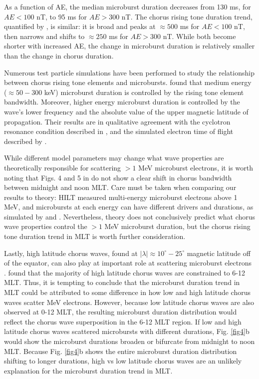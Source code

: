 \documentclass[draft]{agujournal2019}
\begin{document}
As a function of AE, the median microburst duration decreases from 130 ms, for $AE < 100$ nT, to 95 ms for $AE > 300$ nT. The chorus rising tone duration trend, quantified by , is similar: it is broad and peaks at $\approx 500$ ms for $AE < 100$ nT, then narrows and shifts to $\approx 250$ ms for $AE > 300$ nT. While both become shorter with increased AE, the change in microburst duration is relatively smaller than the change in chorus duration.

Numerous test particle simulations have been performed to study the relationship between chorus rising tone elements and microbursts.  found that medium energy ($\approx 50-300$ keV) microburst duration is controlled by the rising tone element bandwidth. Moreover, higher energy microburst duration is controlled by the wave's lower frequency and the absolute value of the upper magnetic latitude of propagation. Their results are in qualitative agreement with the cyclotron resonance condition described in , and the simulated electron time of flight described by .

While different model parameters may change what wave properties are theoretically responsible for scattering $>1$ MeV microburst electrons, it is worth noting that Figs. 4 and 5 in  do not show a clear shift in chorus bandwidth between midnight and noon MLT. Care must be taken when comparing our results to theory: HILT measured multi-energy microburst electrons above 1 MeV, and microbursts at each energy can have different drivers and durations, as simulated by  and . Nevertheless, theory does not conclusively predict what chorus wave properties control the $> 1$ MeV microburst duration, but the chorus rising tone duration trend in MLT is worth further consideration. 

Lastly, high latitude chorus waves, found at $|\lambda| \approx 10^\circ-25^\circ$ magnetic latitude off of the equator, can also play at important role at scattering microburst electrons \cite{Lorentzen2001a}.  found that the majority of high latitude chorus waves are constrained to 6-12 MLT. Thus, it is tempting to conclude that the microburst duration trend in MLT could be attributed to some difference in how low and high latitude chorus waves scatter MeV electrons. However, because low latitude chorus waves are also observed at 0-12 MLT, the resulting microburst duration distribution would reflect the chorus wave superposition in the 6-12 MLT region. If low and high latitude chorus waves scattered microbursts with different durations, Fig. \ref{fig4}b would show the microburst durations broaden or bifurcate from midnight to noon MLT. Because Fig. \ref{fig4}b shows the entire microburst duration distribution shifting to longer durations, high vs low latitude chorus waves are an unlikely explanation for the microburst duration trend in MLT.
\end{document}
